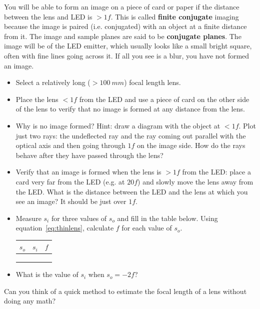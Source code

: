 \documentclass[a4paper]{report}
\newcommand{\nexercise}[0]{\arabic{exercises}\addtocounter{exercises}{1}}
\begin{document}


You will be able to form an image on a piece of card or paper if the distance between the lens and LED is $>1f$. This is called \textbf{finite conjugate} imaging because the image is paired (i.e. conjugated) with an object at a finite distance from it.
The image and sample planes are said to be \textbf{conjugate planes}.
The image will be of the LED emitter, which usually looks like a small bright square, often with fine lines going across it. 
If all you see is a blur, you have not formed an image.

\begin{exercisebox}[frametitle={Exercise \nexercise: Image formation}]
\begin{itemize}
\item Select a relatively long ($>100~mm$) focal length lens.
\item Place the lens $<1f$ from the LED and use a piece of card on the other side of the lens to verify that no image is formed at any distance from the lens.
\item Why is no image formed? 
Hint: draw a diagram with the object at $<1f$. Plot just two rays: the undeflected ray and the ray coming out parallel with the optical axis and then going through $1f$ on the image side. 
How do the rays behave after they have passed through the lens?
\item Verify that an image is formed when the lens is $>1f$ from the LED: place a card very far from the LED (e.g. at $20f$) and slowly move the lens away from the LED. 
What is the distance between the LED and the lens at which you see an image? 
It should be just over $1f$.
\item Measure $s_i$ for three values of $s_o$ and fill in the table below. 
Using equation~\ref{eq:thinlens}, calculate $f$ for each value of $s_o$.
\begin{center}
\begin{tabular}{| p{1cm} | p{1cm} | p{1cm} |}
\hline
 $s_o$  &  $s_i$  &  $f$  \\
\hline
\hline
 & & \\ \hline
 & & \\ \hline
 & & \\ \hline
\end{tabular} 	
\end{center}
\item What is the value of $s_i$ when $s_o=-2f$?
\end{itemize}
\vspace{0.5em}
Can you think of a quick method to estimate the focal length of a lens without doing any math?
\end{exercisebox}
\end{document}
